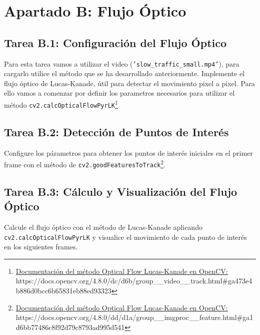 \chapter{Apartado B: \textbf{Flujo Óptico}}
\label{chapter:tarea_b}

\section*{Tarea B.1: Configuración del Flujo Óptico}
{}
Para esta tarea vamos a utilizar el video (\texttt{'slow\_traffic\_small.mp4'}), para cargarlo utilice el método que se ha desarrollado anteriormente.
Implemente el flujo óptico de Lucas-Kanade, útil para detectar el movimiento pixel a pixel. Para ello vamos a comenzar por definir los parametros necesarios para utilizar el método \texttt{cv2.calcOpticalFlowPyrLK}\footnote{ \href{https://docs.opencv.org/4.8.0/dc/d6b/group\_\_video\_\_track.html\#ga473e4b886d0bcc6b65831eb88ed93323}{Documentación del método Optical Flow Lucas-Kanade en OpenCV:} \\{https://docs.opencv.org/4.8.0/dc/d6b/group\_\_video\_\_track.html\#ga473e4b886d0bcc6b65831eb88ed93323}}

\section*{Tarea B.2: Detección de Puntos de Interés}
{}
Configure los párametros para obtener los puntos de interés iniciales en el primer frame con el método de \texttt{cv2.goodFeaturesToTrack}\footnote{ \href{https://docs.opencv.org/4.8.0/dd/d1a/group\_\_imgproc\_\_feature.html\#ga1d6bb77486c8f92d79c8793ad995d541}{Documentación del método Optical Flow Lucas-Kanade en OpenCV:} \\{https://docs.opencv.org/4.8.0/dd/d1a/group\_\_imgproc\_\_feature.html\#ga1d6bb77486c8f92d79c8793ad995d541}}.

\section*{Tarea B.3: Cálculo y Visualización del Flujo Óptico}
{}
Calcule el flujo óptico con el método de Lucas-Kanade aplicando \texttt{cv2.calcOpticalFlowPyrLK} y visualice el movimiento de cada punto de interés en los siguientes frames.

